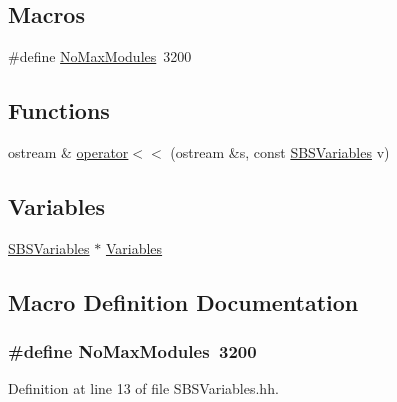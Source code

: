 \subsection*{Macros}
\begin{DoxyCompactItemize}
\item 
\#define \hyperlink{_s_b_s_variables_8hh_a21d17ff9655f0bbc9bb0faf039bdd525}{No\-Max\-Modules}~3200
\end{DoxyCompactItemize}
\subsection*{Functions}
\begin{DoxyCompactItemize}
\item 
ostream \& \hyperlink{_s_b_s_variables_8hh_a622038ca73b8828dd5c19c780d1de95c}{operator$<$$<$} (ostream \&s, const \hyperlink{class_s_b_s_variables}{S\-B\-S\-Variables} v)
\end{DoxyCompactItemize}
\subsection*{Variables}
\begin{DoxyCompactItemize}
\item 
\hyperlink{class_s_b_s_variables}{S\-B\-S\-Variables} $\ast$ \hyperlink{_s_b_s_variables_8hh_aaa4c7e8ec08cba6569c1ae6ddaa0a388}{Variables}
\end{DoxyCompactItemize}


\subsection{Macro Definition Documentation}
\hypertarget{_s_b_s_variables_8hh_a21d17ff9655f0bbc9bb0faf039bdd525}{
\subsubsection[{No\-Max\-Modules}]{\setlength{\rightskip}{0pt plus 5cm}\#define No\-Max\-Modules~3200}}\label{_s_b_s_variables_8hh_a21d17ff9655f0bbc9bb0faf039bdd525}


Definition at line 13 of file S\-B\-S\-Variables.\-hh.



